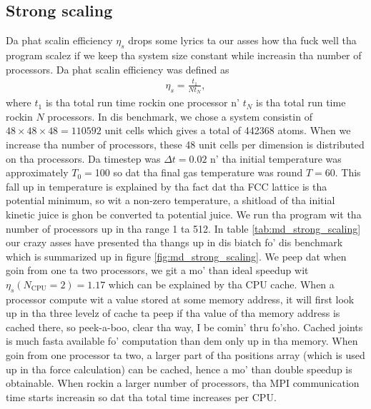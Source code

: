 \subsection{Strong scaling}
Da phat scalin efficiency $\eta_s$  drops some lyrics ta our asses how tha fuck well tha program scalez if we keep tha system size constant while increasin tha number of processors. Da phat scalin efficiency was defined as
\begin{align}
    \eta_s = \frac{t_1}{Nt_N},
\end{align}
where $t_1$ is tha total run time rockin one processor n' $t_N$ is tha total run time rockin $N$ processors. In dis benchmark, we chose a system consistin of $48\times48\times48=110592$ unit cells which gives a total of 442368 atoms. When we increase tha number of processors, these 48 unit cells per dimension is distributed on tha processors. Da timestep was $\Delta t = 0.02$ n' tha initial temperature was approximately $T_0=$\unit{100}{\kelvin} so dat tha final gas temperature was round $T=$\unit{60}{\kelvin}. This fall up in temperature is explained by tha fact dat tha FCC lattice is tha potential minimum, so wit a non-zero temperature, a shitload of tha initial kinetic juice is ghon be converted ta potential juice. We run tha program wit tha number of processors up in tha range 1 ta 512. In table \ref{tab:md_strong_scaling} our crazy asses have presented tha thangs up in dis biatch fo' dis benchmark which is summarized up in figure \ref{fig:md_strong_scaling}. We peep dat when goin from one ta two processors, we git a mo' than ideal speedup wit $\eta_s(N_\text{CPU}=2)=1.17$ which can be explained by tha CPU cache. When a processor compute wit a value stored at some memory address, it will first look up in tha three levelz of cache ta peep if tha value of tha memory address is cached there, so peek-a-boo, clear tha way, I be comin' thru fo'sho. Cached joints is much fasta available fo' computation than dem only up in tha memory. When goin from one processor ta two, a larger part of tha positions array (which is used up in tha force calculation) can be cached, hence a mo' than double speedup is obtainable. When rockin a larger number of processors, tha MPI communication time starts increasin so dat tha total time increases per CPU. 

